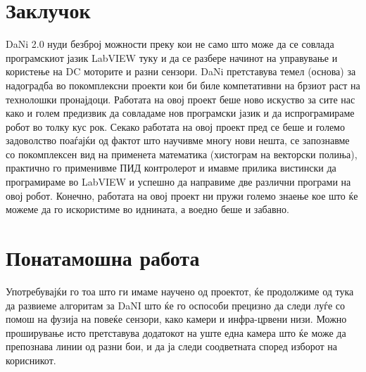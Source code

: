 \documentclass{article}
\begin{document}
\section{Заклучок}
DaNi 2.0 нуди безброј можности преку кои не само што може да се совлада програмскиот јазик LabVIEW туку и да се разбере начинот на управување и користење на DC моторите и разни сензори. DaNi претставува темел (основа) за надоградба во покомплексни проекти кои би биле компетативни на брзиот раст на технолошки пронајдоци. Работата на овој проект беше ново искуство за сите нас како и голем предизвик да совладаме нов програмски јазик и да испрограмираме робот во толку кус рок. Секако работата на овој проект пред се беше и големо задоволство поаѓајќи од фактот што научивме многу нови нешта, се запознавме со покомплексен вид на применета математика (хистограм на векторски полиња), практично го применивме ПИД контролерот и имавме прилика вистински да програмираме во LabVIEW и успешно да направиме две различни програми на овој робот. Конечно, работата на овој проект ни пружи големо знаење кое што ќе можеме да го искористиме во иднината, а воедно беше и забавно.

\section{Понатамошна работа}
Употребувајќи го тоа што ги имаме научено од проектот, ќе продолжиме од тука да развиеме алгоритам за DaNI што ќе го оспособи прецизно да следи луѓе со помош на фузија на повеќе сензори, како камери и инфра-црвени низи. Можно проширување исто претставува додатокот на уште една камера што ќе може да препознава линии од разни бои, и да ја следи соодветната според изборот на корисникот.

\medskip
\nocite{*}
\printbibliography[heading=bibintoc,title={Користена литература}]
\end{document}
